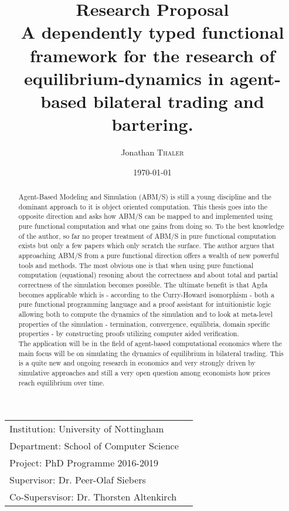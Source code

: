 \documentclass{article}
\title{Research Proposal \\ A dependently typed functional framework for the research of equilibrium-dynamics in agent-based bilateral trading and bartering.} %
\author{Jonathan \textsc{Thaler}} %
\date{\today} %
\begin{document}
\maketitle %

\begin{center}
\begin{tabular}{l r}
Institution: University of Nottingham \\
Department: School of Computer Science \\
Project: PhD Programme 2016-2019 \\
Supervisor: Dr. Peer-Olaf Siebers \\
Co-Supersvisor: Dr. Thorsten Altenkirch 
\end{tabular}
\end{center}

\begin{abstract}
Agent-Based Modeling and Simulation (ABM/S) is still a young discipline and the dominant approach to it is object oriented computation. This thesis goes into the opposite direction and asks how ABM/S can be mapped to and implemented using pure functional computation and what one gains from doing so. To the best knowledge of the author, so far no proper treatment of ABM/S in pure functional computation exists but only a few papers which only scratch the surface. The author argues that approaching ABM/S from a pure functional direction  offers a wealth of new powerful tools and methods. The most obvious one is that when using pure functional computation (equational) resoning about the correctness and about total and partial correctness of the simulation becomes possible. The ultimate benefit is that Agda becomes applicable which is - according to the Curry-Howard isomorphism - both a pure functional programming language and a proof assistant for intuitionistic logic allowing both to compute the dynamics of the simulation and to look at meta-level properties of the simulation - termination, convergence, equilibria, domain specific properties - by constructing proofs utilizing computer aided verification. \\
The application will be in the field of agent-based computational economics where the main focus will be on simulating the dynamics of equilibrium in bilateral trading. This is a quite new and ongoing research in economics and very strongly driven by simulative approaches and still a very open question among economists how prices reach equilibrium over time.

\end{abstract}
\end{document}
